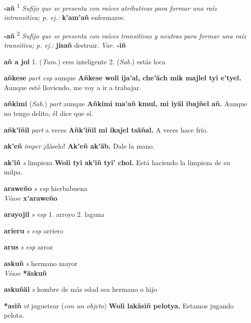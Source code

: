 \documentclass[10pt]{scrbook}
\newcommand{\entry}[1]{\textbf{#1}}
\newcommand{\onedefinition}[1]{#1.}
\newcommand{\defsuperscript}[1]{\textsuperscript{#1}}
\newcommand{\nontranslationdef}[1]{\textit{#1}}
\newcommand{\partofspeech}[1]{\textit{#1}}
\newcommand{\spanishtranslation}[1]{#1}
\newcommand{\clarification}[1]{(\textit{#1})}
\newcommand{\cholexample}[1]{\textbf{#1}}
\newcommand{\exampletranslation}[1]{#1}
\newcommand{\alsosee}[1]{\\\textit{Véase} \textbf{#1}}
\newcommand{\relevantdialect}[1]{(\textit{#1})}
\newcommand{\variation}[1]{\textit{Var.} \textbf{#1}}
\begin{document}
\begin{multicols}{2}
\entry{-añ}
\defsuperscript{1}
\nontranslationdef{Sufijo que se presenta con raíces atributivas para formar una raíz intransitiva; p. ej.:}
\cholexample{k'am'añ}
\exampletranslation{enfermarse.}

\entry{-añ}
\defsuperscript{2}
\nontranslationdef{Sufijo que se presenta con raíces transitivas y neutras para formar una raíz transitiva; p. ej.:}
\cholexample{jisañ}
\exampletranslation{destruir.}
\variation{-iñ}

\entry{añ a jol}
\onedefinition{1}
\relevantdialect{Tum.}
\spanishtranslation{eres inteligente}
\onedefinition{2}
\relevantdialect{Sab.}
\spanishtranslation{estás loca}

\entry{añkese}
\partofspeech{part esp}
\spanishtranslation{aunque}
\cholexample{Añkese woli ija'al, che'äch mik majlel tyi e'tyel.}
\exampletranslation{Aunque esté lloviendo, me voy a ir a trabajar.}

\entry{añkimi}
\relevantdialect{Sab.}
\partofspeech{part}
\spanishtranslation{aunque}
\cholexample{Añkimi ma'añ kmul, mi iyäl ibajñel añ.}
\exampletranslation{Aunque no tengo delito, él dice que sí.}

\entry{añk'iñil}
\partofspeech{part}
\spanishtranslation{a veces}
\cholexample{Añk'iñil mi ikajel tsäñal.}
\exampletranslation{A veces hace frío.}

\entry{ak'eñ}
\partofspeech{imper}
\spanishtranslation{¡dáselo!}
\cholexample{Ak'eñ ak'äb.}
\exampletranslation{Dale la mano.}

\entry{ak'iñ}
\partofspeech{s}
\spanishtranslation{limpieza}
\cholexample{Woli tyi ak'iñ tyi' chol.}
\exampletranslation{Está haciendo la limpieza de su milpa.}

\entry{araweño}
\partofspeech{s esp}
\spanishtranslation{hierbabuena}
\alsosee{x'araweño}

\entry{arayojil}
\partofspeech{s esp}
\onedefinition{1}
\spanishtranslation{arroyo}
\onedefinition{2}
\spanishtranslation{laguna}

\entry{arieru}
\partofspeech{s esp}
\spanishtranslation{arriero}

\entry{arus}
\partofspeech{s esp}
\spanishtranslation{arroz}

\entry{askuñ}
\partofspeech{s}
\spanishtranslation{hermano mayor}
\alsosee{*äskuñ}

\entry{askuñäl}
\partofspeech{s}
\spanishtranslation{hombre de más edad sea hermano o hijo}

\entry{*asiñ}
\partofspeech{vt}
\spanishtranslation{juguetear}
\clarification{con un objeto}
\cholexample{Woli lakäsiñ pelotya.}
\exampletranslation{Estamos jugando pelota.}


\end{multicols}
\end{document}
